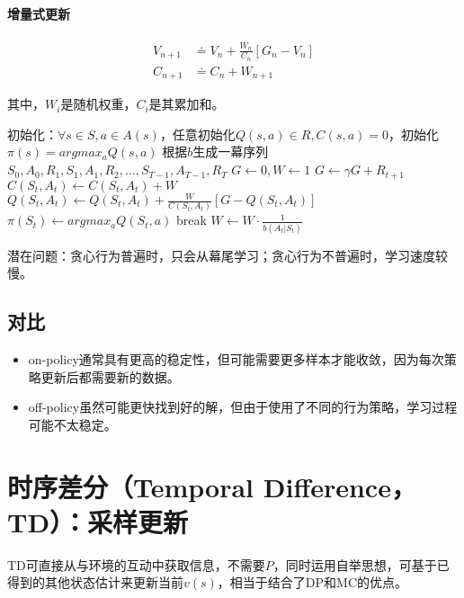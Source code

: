\documentclass[
12pt, %
a4paper, 
oneside, %
headinclude,footinclude, %
]{scrartcl}
\begin{document}
\paragraph{增量式更新}
\begin{align*}
V_{n + 1} &\doteq V_n + \frac{W_n}{C_n}[G_n - V_n] \\
C_{n + 1} &\doteq C_n + W_{n + 1}
\end{align*}

其中，$ W_i $是随机权重，$ C_i $是其累加和。
\begin{myalgorithm}
\State 初始化：$ \forall s \in S, a \in A(s) $，任意初始化$ Q(s,a) \in R, C(s,a) = 0 $，初始化$ \pi(s) = argmax_a Q(s,a) $ 
\Loop
\State 根据$ b $生成一幕序列$ S_0,A_0,R_1,S_1,A_1,R_2,\dots,S_{T - 1},A_{T - 1},R_T $ 
\State $ G \gets 0, W \gets 1 $
\State $ G \gets \gamma G + R_{t + 1} $
\State $ C(S_t,A_t) \gets C(S_t,A_t) + W $
\State $ Q(S_t,A_t) \gets Q(S_t,A_t) + \frac{W}{C(S_t,A_t)}[G - Q(S_t,A_t)] $
\State $ \pi(S_t) \gets argmax_a Q(S_t,a) $
\State break 
\EndIf
\State $ W \gets W \cdot \frac{1}{b(A_t|S_t)} $ 
\EndFor
\EndLoop
\end{myalgorithm}

潜在问题：贪心行为普遍时，只会从幕尾学习；贪心行为不普遍时，学习速度较慢。
\subsection[对比]{对比}
\begin{itemize}
\item on-policy通常具有更高的稳定性，但可能需要更多样本才能收敛，因为每次策略更新后都需要新的数据。
\item off-policy虽然可能更快找到好的解，但由于使用了不同的行为策略，学习过程可能不太稳定。
\end{itemize}
\section[时序差分]{时序差分（Temporal Difference，TD）：采样更新}
TD可直接从与环境的互动中获取信息，不需要$ P $，同时运用自举思想，可基于已得到的其他状态估计来更新当前$ v(s) $，相当于结合了DP和MC的优点。
\end{document}
